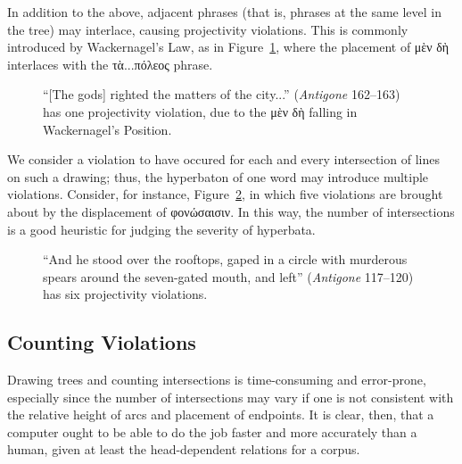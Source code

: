 \documentclass{article}
\begin{document}
In addition to the above, adjacent phrases (that is, phrases at the same level
in the tree) may interlace, causing projectivity violations. This is commonly
introduced by Wackernagel's Law, as in Figure~\ref{fig:wackernagel}, where the
placement of μὲν δὴ interlaces with the τὰ...πόλεος phrase.

\begin{figure}[h!]
\centering
{}
\caption{``[The gods] righted the matters of the city...'' (\emph{Antigone}
162--163) has
one projectivity violation, due to the μὲν δὴ falling in Wackernagel's Position.}
\label{fig:wackernagel}
\end{figure}

We consider a violation to have occured for each and every intersection of lines
on such a drawing; thus, the hyperbaton of one word may introduce multiple
violations. Consider, for instance, Figure~\ref{fig:stas-tree}, in which five
violations are brought about by the displacement of φονώσαισιν. In this way, the
number of intersections is a good heuristic for judging the severity of
hyperbata.

\begin{figure}[h!]
\centering
{}
\caption{``And he stood over the rooftops, gaped in a circle with murderous
spears around the seven-gated mouth, and left'' (\emph{Antigone}
117--120) has six projectivity violations.}
\label{fig:stas-tree}
\end{figure}

\subsection{Counting Violations}

Drawing trees and counting intersections is time-consuming and error-prone,
especially since the number of intersections may vary if one is not consistent
with the relative height of arcs and placement of endpoints. It is clear, then,
that a computer ought to be able to do the job faster and more accurately than a
human, given at least the head-dependent relations for a corpus.
\end{document}
